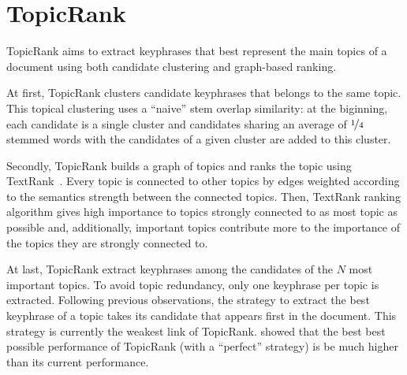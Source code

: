 \section{TopicRank}
\label{sec:topicrank}
  TopicRank aims to extract keyphrases that best represent the main topics of a
  document using both candidate clustering and graph-based ranking.

  At first, TopicRank clusters candidate keyphrases that belongs to the same
  topic. This topical clustering uses a ``naive'' stem overlap similarity: at
  the biginning, each candidate is a single cluster and candidates sharing an
  average of $\unitfrac{1}{4}$ stemmed words with the candidates of a given
  cluster are added to this cluster.

  Secondly, TopicRank builds a graph of topics and ranks the topic using
  TextRank~\cite{mihalcea2004textrank}. Every topic is connected to other topics
  by edges weighted according to the semantics strength between the connected
  topics. Then, TextRank ranking algorithm gives high importance to topics
  strongly connected to as most topic as possible and, additionally, important
  topics contribute more to the importance of the topics they are strongly
  connected to.

  At last, TopicRank extract keyphrases among the candidates of the $N$ most
  important topics. To avoid topic redundancy, only one keyphrase per topic is
  extracted. Following previous observations, the strategy to extract the best
  keyphrase of a topic takes its candidate that appears first in the document.
  This strategy is currently the weakest link of TopicRank.
   showed that the best best possible performance
  of TopicRank (with a ``perfect'' strategy) is be much higher than its current
  performance.


